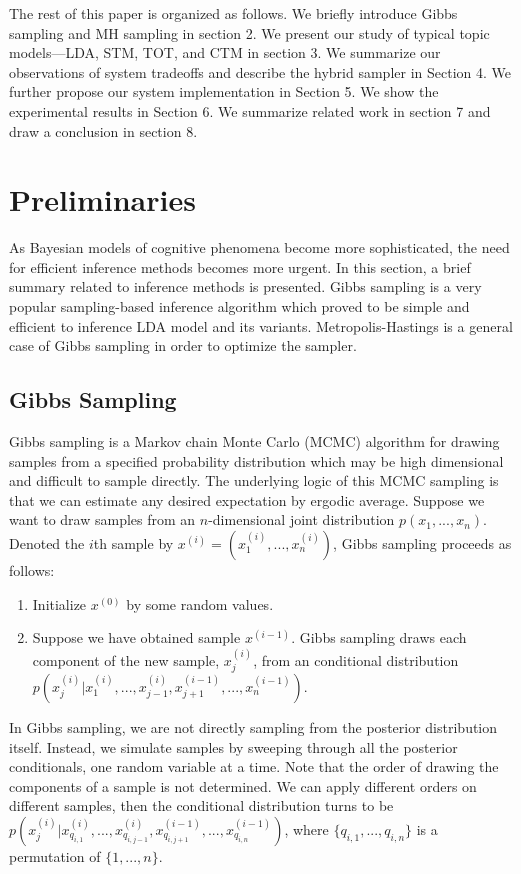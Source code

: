 \documentclass[10pt,journal,cspaper,compsoc]{IEEEtran}
\begin{document}
The rest of this paper is organized as follows. 
We briefly introduce Gibbs sampling and MH sampling in section 2. 
We present our study of typical topic models---LDA, STM, TOT, and CTM in section 3. We summarize our observations of system tradeoffs and describe the hybrid sampler in Section 4. We further propose our system implementation in Section 5. We show the experimental results in Section 6.
We summarize related work in section 7 and draw a conclusion in section 8.


\section{Preliminaries}
    As Bayesian models of cognitive phenomena become more sophisticated, the need for efficient inference methods becomes more urgent. In this section, a brief summary related to inference methods is presented.
    Gibbs sampling is a very popular sampling-based inference algorithm which proved to be simple 
    and efficient to inference LDA model and its variants. 
    Metropolis-Hastings is a general case of Gibbs sampling in order to optimize the sampler. 
    
    \subsection{Gibbs Sampling}
    Gibbs sampling is a Markov chain Monte Carlo (MCMC)
    algorithm for drawing samples from a specified 
    probability distribution which may be high dimensional and difficult to sample directly. The underlying logic of this MCMC sampling is that we can estimate any desired expectation by ergodic average.                        
    Suppose we want to draw samples from an $n$-dimensional
    joint distribution $p(x_1,...,x_n)$. Denoted the $i$th sample by $x^{(i)}=(x_1^{(i)},...,x_n^{(i)})$, Gibbs sampling proceeds as follows:
    \begin{enumerate}
        \item Initialize $x^{(0)}$ by some random values.
        \item Suppose we have obtained sample $x^{(i-1)}$.
        Gibbs sampling draws each component of the new sample, $x_j^{(i)}$, from an conditional distribution
        $p(x_j^{(i)}|x_1^{(i)},...,x_{j-1}^{(i)},
        x_{j+1}^{(i-1)},...,x_n^{(i-1)})$.
    \end{enumerate}
    In Gibbs sampling, we are not directly sampling from the posterior distribution itself. Instead, we simulate samples by sweeping through all the posterior conditionals, one random variable at a time. Note that the order of drawing the components of a sample 
    is not determined. We can apply different orders on 
    different samples, then the conditional distribution
    turns to be $p(x_j^{(i)}|x_{q_{i,1}}^{(i)},...,x_{q_{i,j-1}}^{(i)}, x_{q_{i,j+1}}^{(i-1)},...,x_{q_{i,n}}^{(i-1)})$, where 
    $\{q_{i,1},...,q_{i,n}\}$ is a permutation of $\{1,...,n\}$.
    
\end{document}
